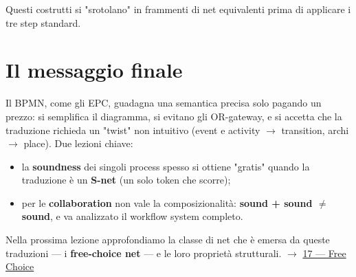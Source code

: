 Questi costrutti si "srotolano" in frammenti di net equivalenti prima di applicare i tre step standard.

\section{\texorpdfstring{Il messaggio finale}{Il messaggio finale}}

Il BPMN, come gli EPC, guadagna una semantica precisa solo pagando un prezzo: si semplifica il diagramma, si evitano gli OR-gateway, e si accetta che la traduzione richieda un "twist" non intuitivo (event e activity $\rightarrow$ transition, archi $\rightarrow$ place). Due lezioni chiave:

\begin{itemize}
\item la \textbf{soundness} dei singoli process spesso si ottiene "gratis" quando la traduzione è un \textbf{S-net} (un solo token che scorre);
\item per le \textbf{collaboration} non vale la composizionalità: \textbf{sound + sound $\neq$ sound}, e va analizzato il workflow system completo.
\end{itemize}

Nella prossima lezione approfondiamo la classe di net che è emersa da queste traduzioni — i \textbf{free-choice net} — e le loro proprietà strutturali. $\rightarrow$ \hyperref[ch:17]{17 — Free Choice}